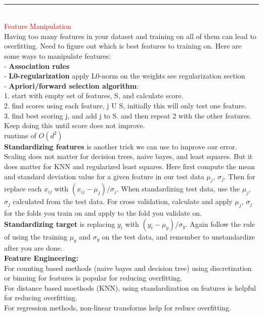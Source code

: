 \documentclass[8pt]{extarticle}
\begin{document}
\begin{multicols*}{2}
\\
\rule{\linewidth}{0.5mm} 
\\
\textcolor{red}{Feature Manipulation}
\\
Having too many features in your dataset and training on all of them can lead to overfitting. Need to figure out which is best features to training on. Here are some ways to manipulate features:
\\
- \textbf{Association rules}
\\
- \textbf{L0-regularization} apply L0-norm on the weights see regularization section
\\
- \textbf{Apriori/forward selection algorithm}:
\\
1. start with empty set of features, S, and calculate score.
\\
2. find scores using each feature, j U S, initially this will only test one feature.
\\
3. find best scoring j, and add j to S. and then repeat 2 with the other features. Keep doing this until score does not improve.
\\
runtime of $O(d^2)$
\\
\textbf{Standardizing features} is another trick we can use to improve our error. Scaling does not matter for decision trees, naive bayes, and least squares. But it does matter for KNN and regularized least squares. Here first compute the mean and standard deviation value for a given feature in our test data $\mu_j$, $\sigma_j$. Then for replace each $x_{ij}$ with $(x_{ij}-\mu_j)/\sigma_j$. When standardizing test data, use the $\mu_j$, $\sigma_j$ calculated from the test data. For cross validation, calculate and apply $\mu_j$, $\sigma_j$ for the folds you train on and apply to the fold you validate on.
\\
\textbf{Standardizing target} is replacing $y_{i}$ with $(y_{i}-\mu_y)/\sigma_y$. Again follow the rule of using the training $\mu_y$ and $\sigma_y$ on the test data, and remember to unstandardize after you are done. 
\\
\textbf{Feature Engineering:}
\\
For counting based methods (naive bayes and decision tree) using discretization or binning for features is popular for reducing overfitting.
\\
For distance based moethods (KNN), using standardization on features is helpful for reducing overfitting.
\\
For regression methods, non-linear transforms help for reduce overfitting.
\\

\end{multicols*}
\end{document}

